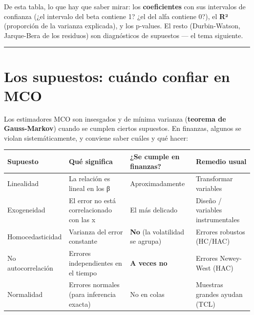 \documentclass[
  spanish,
  letterpaper,
  DIV=11,
  numbers=noendperiod]{scrreprt}
\begin{document}
De esta tabla, lo que hay que saber mirar: los \textbf{coeficientes} con
sus intervalos de confianza (¿el intervalo del beta contiene 1? ¿el del
alfa contiene 0?), el \textbf{R²} (proporción de la varianza explicada),
y los p-values. El resto (Durbin-Watson, Jarque-Bera de los residuos)
son diagnósticos de supuestos --- el tema siguiente.

\begin{center}\rule{0.5\linewidth}{0.5pt}\end{center}

\chapter{Los supuestos: cuándo confiar en
MCO}\label{los-supuestos-cuuxe1ndo-confiar-en-mco}

Los estimadores MCO son insesgados y de mínima varianza (\textbf{teorema
de Gauss-Markov}) cuando se cumplen ciertos supuestos. En finanzas,
algunos se violan sistemáticamente, y conviene saber cuáles y qué hacer:

\begin{longtable}[]{@{}
  >{\raggedright\arraybackslash}p{}
  >{\raggedright\arraybackslash}p{}
  >{\raggedright\arraybackslash}p{}
  >{\raggedright\arraybackslash}p{}@{}}
\toprule\noalign{}
\begin{minipage}[b]{\linewidth}\raggedright
Supuesto
\end{minipage} & \begin{minipage}[b]{\linewidth}\raggedright
Qué significa
\end{minipage} & \begin{minipage}[b]{\linewidth}\raggedright
¿Se cumple en finanzas?
\end{minipage} & \begin{minipage}[b]{\linewidth}\raggedright
Remedio usual
\end{minipage} \\
\midrule\noalign{}
\endhead
\bottomrule\noalign{}
\endlastfoot
Linealidad & La relación es lineal en los β & Aproximadamente &
Transformar variables \\
Exogeneidad & El error no está correlacionado con las x & El más
delicado & Diseño / variables instrumentales \\
Homocedasticidad & Varianza del error constante & \textbf{No} (la
volatilidad se agrupa) & Errores robustos (HC/HAC) \\
No autocorrelación & Errores independientes en el tiempo & \textbf{A
veces no} & Errores Newey-West (HAC) \\
Normalidad & Errores normales (para inferencia exacta) & No en colas &
Muestras grandes ayudan (TCL) \\
\end{longtable}
\end{document}

